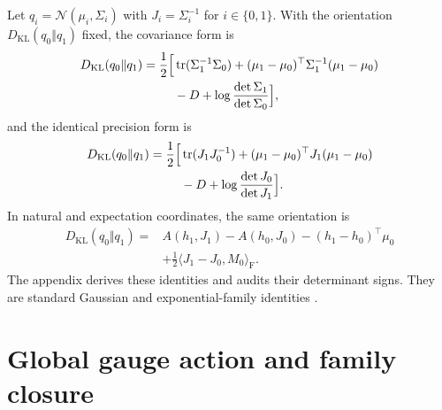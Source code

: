 Let $q_i=\mathcal N(\mu_i,\Sigma_i)$ with $J_i=\Sigma_i^{-1}$ for $i\in\{0,1\}$.  With the orientation $D_{\mathrm{KL}}(q_0\Vert q_1)$ fixed, the covariance form is
\begin{equation}
\begin{aligned}
D_{\mathrm{KL}}(q_0\Vert q_1)
=\frac12\Bigl[
&\operatorname{tr}(\Sigma_1^{-1}\Sigma_0)
+(\mu_1-\mu_0)^\top
\Sigma_1^{-1}(\mu_1-\mu_0)\\
&-D+\log\frac{\det\Sigma_1}{\det\Sigma_0}
\Bigr],
\end{aligned}
\label{eq:gaussian-kl-covariance-form}
\end{equation}
and the identical precision form is
\begin{equation}
\begin{aligned}
D_{\mathrm{KL}}(q_0\Vert q_1)
=\frac12\Bigl[
&\operatorname{tr}(J_1J_0^{-1})
+(\mu_1-\mu_0)^\top J_1(\mu_1-\mu_0)\\
&-D+\log\frac{\det J_0}{\det J_1}
\Bigr].
\end{aligned}
\label{eq:gaussian-kl-precision-form}
\end{equation}
In natural and expectation coordinates, the same orientation is
\begin{equation}
\begin{aligned}
D_{\mathrm{KL}}(q_0\Vert q_1)
={}&A(h_1,J_1)-A(h_0,J_0)
-(h_1-h_0)^\top\mu_0\\
&+\frac12\langle J_1-J_0,M_0\rangle_{\mathrm F}.
\end{aligned}
\label{eq:gaussian-kl-natural-expectation-form}
\end{equation}
The appendix derives these identities and audits their determinant signs.  They are standard Gaussian and exponential-family identities \citep{Kullback1951,petersen2012matrix,Wainwright2008}.

\section{Global gauge action and family closure}

